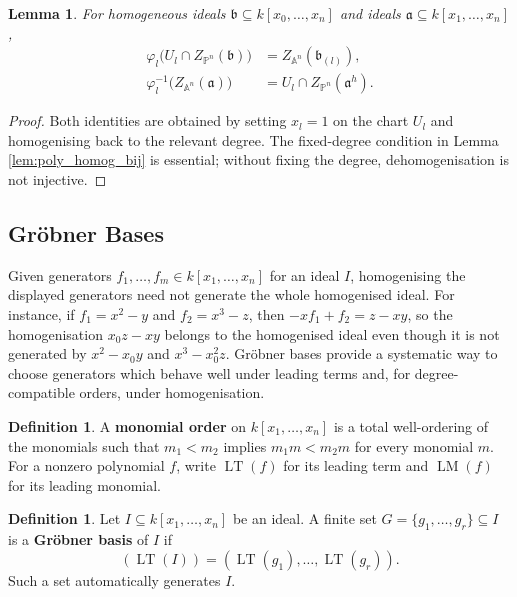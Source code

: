 \documentclass[12pt]{article}
\theoremstyle{plain}
\newtheorem{lemma}[thm]{Lemma}
\theoremstyle{definition}
\newtheorem{defn}[thm]{Definition} %
\newcommand{\bb}[1]{\mathbb{#1}}
\begin{document}
\begin{lemma}\label{closedsets}
For homogeneous ideals $\mathfrak b\subseteq k[x_0,\ldots,x_n]$ and ideals $\mathfrak a\subseteq k[x_1,\ldots,x_n]$,
\begin{align*}
\varphi_l\big(U_l\cap Z_{\bb P^n}(\mathfrak b)\big)&=Z_{\bb A^n}(\mathfrak b_{(l)}),\\
\varphi_l^{-1}\big(Z_{\bb A^n}(\mathfrak a)\big)&=U_l\cap Z_{\bb P^n}(\mathfrak a^h).
\end{align*}
\end{lemma}
\begin{proof}
Both identities are obtained by setting $x_l=1$ on the chart $U_l$ and homogenising back to the relevant degree. The fixed-degree condition in Lemma \ref{lem:poly_homog_bij} is essential; without fixing the degree, dehomogenisation is not injective.
\end{proof}

\subsection{Gr\"{o}bner Bases}
Given generators $f_1,\ldots,f_m\in k[x_1,\ldots,x_n]$ for an ideal $I$, homogenising the displayed generators need not generate the whole homogenised ideal. For instance, if $f_1=x^2-y$ and $f_2=x^3-z$, then $-xf_1+f_2=z-xy$, so the homogenisation $x_0z-xy$ belongs to the homogenised ideal even though it is not generated by $x^2-x_0y$ and $x^3-x_0^2z$. Gr\"obner bases provide a systematic way to choose generators which behave well under leading terms and, for degree-compatible orders, under homogenisation.

\begin{defn}
A \textbf{monomial order} on $k[x_1,\ldots,x_n]$ is a total well-ordering of the monomials such that $m_1<m_2$ implies $m_1m<m_2m$ for every monomial $m$. For a nonzero polynomial $f$, write $\operatorname{LT}(f)$ for its leading term and $\operatorname{LM}(f)$ for its leading monomial.
\end{defn}

\begin{defn}
Let $I\subseteq k[x_1,\ldots,x_n]$ be an ideal. A finite set $G=\{g_1,\ldots,g_r\}\subseteq I$ is a \textbf{Gr\"obner basis} of $I$ if
\[
(\operatorname{LT}(I))=(\operatorname{LT}(g_1),\ldots,\operatorname{LT}(g_r)).
\]
Such a set automatically generates $I$.
\end{defn}
\end{document}
